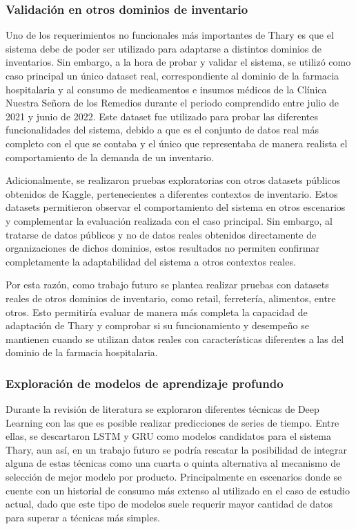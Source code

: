 \subsubsection{Validación en otros dominios de inventario}

Uno de los requerimientos no funcionales más importantes de Thary es que el sistema debe de poder ser utilizado para adaptarse a distintos dominios de inventarios. Sin embargo, a la hora de probar y validar el sistema, se utilizó como caso principal un único dataset real, correspondiente al dominio de la farmacia hospitalaria y al consumo de medicamentos e insumos médicos de la Clínica Nuestra Señora de los Remedios durante el periodo comprendido entre julio de 2021 y junio de 2022. Este dataset fue utilizado para probar las diferentes funcionalidades del sistema, debido a que es el conjunto de datos real más completo con el que se contaba y el único que representaba de manera realista el comportamiento de la demanda de un inventario.

Adicionalmente, se realizaron pruebas exploratorias con otros datasets públicos obtenidos de Kaggle, pertenecientes a diferentes contextos de inventario. Estos datasets permitieron observar el comportamiento del sistema en otros escenarios y complementar la evaluación realizada con el caso principal. Sin embargo, al tratarse de datos públicos y no de datos reales obtenidos directamente de organizaciones de dichos dominios, estos resultados no permiten confirmar completamente la adaptabilidad del sistema a otros contextos reales.

Por esta razón, como trabajo futuro se plantea realizar pruebas con datasets reales de otros dominios de inventario, como retail, ferretería, alimentos, entre otros. Esto permitiría evaluar de manera más completa la capacidad de adaptación de Thary y comprobar si su funcionamiento y desempeño se mantienen cuando se utilizan datos reales con características diferentes a las del dominio de la farmacia hospitalaria.

\subsubsection{Exploración de modelos de aprendizaje profundo}

Durante la revisión de literatura se exploraron diferentes técnicas de Deep Learning con las que es posible realizar predicciones de series de tiempo. Entre ellas, se descartaron LSTM y GRU como modelos candidatos para el sistema Thary, aun así, en un trabajo futuro se podría rescatar la posibilidad de integrar alguna de estas técnicas como una cuarta o quinta alternativa al mecanismo de selección de mejor modelo por producto. Principalmente en escenarios donde se cuente con un historial de consumo más extenso al utilizado en el caso de estudio actual, dado que este tipo de modelos suele requerir mayor cantidad de datos para superar a técnicas más simples.

